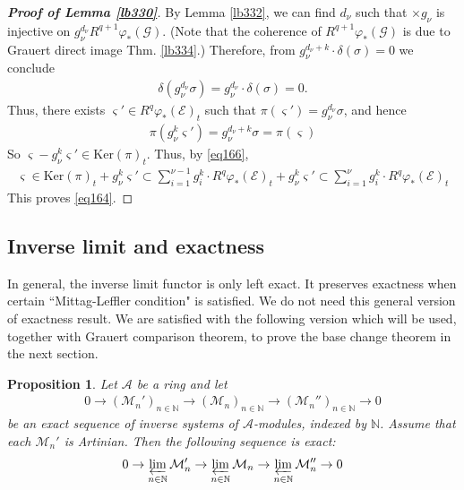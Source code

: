 \documentclass[12pt,b5paper,notitlepage]{report}
\theoremstyle{definition}
\theoremstyle{plain}
\newtheorem{pp}[df]{Proposition}
\newcommand{\mc}{\mathcal}
\newcommand{\scr}{\mathscr}
\newcommand{\sgm}{\varsigma}
\newcommand{\Nbb}{\mathbb N}
\newcommand{\Ker}{\mathrm{Ker}}
\numberwithin{equation}{section}
\begin{document}
\begin{proof}[\textbf{Proof of Lemma \ref{lb330}}]
By Lemma \ref{lb332}, we can find $d_\nu$ such that $\times g_\nu$ is injective on $g_\nu^{d_\nu}R^{q+1}\varphi_*(\scr G)$. (Note that the coherence of $R^{q+1}\varphi_*(\scr G)$ is due to Grauert direct image Thm. \ref{lb334}.) Therefore, from $g_\nu^{d_\nu+k}\cdot \delta(\sigma)=0$ we conclude
\begin{align*}
\delta(g_\nu^{d_\nu}\sigma)=g_\nu^{d_\nu}\cdot \delta(\sigma)=0.
\end{align*}
Thus, there exists $\sgm'\in R^q\varphi_*(\scr E)_t$ such that $\pi(\sgm')=g_\nu^{d_\nu}\sigma$, and hence
\begin{align*}
\pi(g_\nu^k\sgm')=g_\nu^{d_\nu+k}\sigma=\pi(\sgm)
\end{align*}
So $\sgm-g_\nu^k\sgm'\in\Ker(\pi)_t$. Thus, by \eqref{eq166},
\begin{align*}
\sgm\in\Ker(\pi)_t+g_\nu^k\sgm'\subset\sum_{i=1}^{\nu-1} g_i^k\cdot R^q\varphi_*(\scr E)_t+g_\nu^k\sgm'\subset \sum_{i=1}^\nu g_i^k\cdot R^q\varphi_*(\scr E)_t
\end{align*}
This proves \eqref{eq164}.
\end{proof}



\subsection{Inverse limit and exactness}



In general, the inverse limit functor is only left exact. It preserves exactness when certain ``Mittag-Leffler condition" is satisfied. We do not need this general version of exactness result. We are satisfied with the following version which will be used, together with Grauert comparison theorem, to prove the base change theorem in the next section.


\begin{pp}\label{lb333}
Let $\mc A$ be a ring and let
\begin{align*}
0\rightarrow (\mc M_n')_{n\in\Nbb}\rightarrow (\mc M_n)_{n\in\Nbb}\rightarrow(\mc M_n'')_{n\in\Nbb}\rightarrow 0
\end{align*}
be an exact sequence of inverse systems of $\mc A$-modules, indexed by $\Nbb$. Assume that each $\mc M_n'$ is Artinian. Then the following sequence is exact:
\begin{align*}
0\rightarrow\varprojlim_{n\in\Nbb} \mc M_n'\rightarrow \varprojlim_{n\in\Nbb} \mc M_n\rightarrow \varprojlim_{n\in\Nbb} \mc M_n''\rightarrow 0
\end{align*}
\end{pp} 
\end{document}
